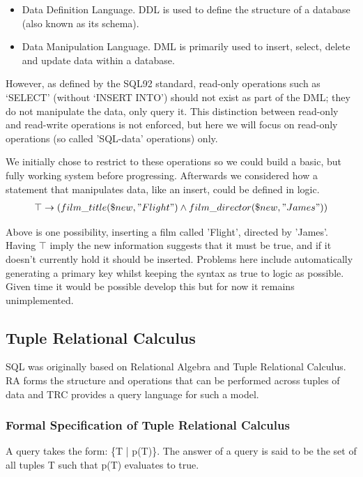 \documentclass[a4paper, 11pt]{article}
\begin{document}
  \begin{itemize}
      \item
        Data Definition Language. DDL is used to define the structure of a
        database (also known as its schema).
      \item
        Data Manipulation Language. DML is primarily used to insert, select,
        delete and update data within a database.
  \end{itemize}

  However, as defined by the SQL92 standard\cite{isoSQL}, read-only operations
  such as `SELECT' (without `INSERT INTO') should not exist as part of the DML;
  they do not manipulate the data, only query it. This distinction between
  read-only and read-write operations is not enforced, but here we will focus
  on read-only operations (so called 'SQL-data' operations) only.

  We initially chose to restrict to these operations so we could build a basic,
  but fully working system before progressing. Afterwards we considered how
  a statement that manipulates data, like an insert, could be defined in logic.
  \begin{gather}
    \top \rightarrow (film\_title(\$new, "Flight") \land film\_director(\$new, "James"))
  \end{gather}

  Above is one possibility, inserting a film called 'Flight', directed by 
  'James'. Having $\top$ imply the new information suggests that it must be 
  true, and if it doesn't currently hold it should be inserted. Problems here
  include automatically generating a primary key whilst keeping the syntax as true to
  logic as possible. Given time it would be possible develop this but for now
  it remains unimplemented.

\subsection{Tuple Relational Calculus}
  SQL was originally based on Relational Algebra and Tuple Relational
  Calculus. RA forms the structure and operations that can be performed
  across tuples of data and TRC provides a query language for such a model.

  \subsubsection{Formal Specification of Tuple Relational Calculus\cite{lecRA}}
    \label{sec:formalTRC}
    A query takes the form: \{T | p(T)\}. The answer of a query is said to be
    the set of all tuples T such that p(T) evaluates to true.
\end{document}
